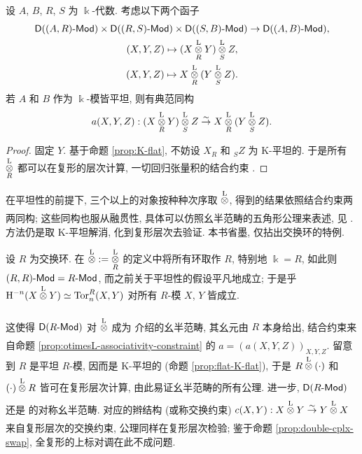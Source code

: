 \begin{proposition}[结合约束]\label{prop:otimesL-associativity-constraint}
	设 $A$, $B$, $R$, $S$ 为 $\Bbbk$-代数. 考虑以下两个函子
	\begin{gather*}
		\cate{D}((A,R)\dcate{Mod}) \times \cate{D}((R,S)\dcate{Mod}) \times \cate{D}((S,B)\dcate{Mod}) \to \cate{D}((A,B)\dcate{Mod}), \\
		(X, Y, Z) \mapsto (X \otimesL[R] Y) \otimesL[S] Z, \\
		(X, Y, Z) \mapsto X \otimesL[R] (Y \otimesL[S] Z).
	\end{gather*}
	若 $A$ 和 $B$ 作为 $\Bbbk$-模皆平坦, 则有典范同构
	\[ a(X,Y,Z): (X \otimesL[R] Y) \otimesL[S] Z \rightiso X \otimesL[R] (Y \otimesL[S] Z). \]
\end{proposition}
\begin{proof}
	固定 $Y$. 基于命题 \ref{prop:K-flat},	不妨设 $X_R$ 和 ${}_S Z$ 为 K-平坦的. 于是所有 $\otimesL[R]$ 都可以在复形的层次计算, 一切回归张量积的结合约束 \cite[命题 6.5.12]{Li1}.
\end{proof}

在平坦性的前提下, 三个以上的对象按种种次序取 $\otimesL$, 得到的结果依照结合约束两两同构; 这些同构也服从融贯性, 具体可以仿照幺半范畴的五角形公理来表述, 见 \cite[定义 3.1.1]{Li1}. 方法仍是取 K-平坦解消, 化到复形层次去验证. 本书省墨, 仅拈出交换环的特例.

\begin{example}\label{eg:commutative-otimesL}
	设 $R$ 为交换环. 在 $\otimesL := \otimesL[R]$ 的定义中将所有环取作 $R$, 特别地 $\Bbbk = R$, 如此则 $(R,R)\dcate{Mod} = R\dcate{Mod}$, 而之前关于平坦性的假设平凡地成立; 于是乎 $\Hm^{-n}(X \otimesL Y) \simeq \Tor^R_n(X,Y)$ 对所有 $R$-模 $X$, $Y$ 皆成立.
	
	这使得 $\cate{D}(R\dcate{Mod})$ 对 $\otimesL$ 成为 \cite[\S 3.1]{Li1} 介绍的幺半范畴, 其幺元由 $R$ 本身给出, 结合约束来自命题 \ref{prop:otimesL-associativity-constraint} 的 $a = (a(X,Y,Z))_{X,Y,Z}$. 留意到 $R$ 是平坦 $R$-模, 因而是 K-平坦的 (命题 \ref{prop:flat-K-flat}), 于是 $R \otimesL (\cdot)$ 和 $(\cdot) \otimesL R$ 皆可在复形层次计算, 由此易证幺半范畴的所有公理. 进一步, $\cate{D}(R\dcate{Mod})$ 还是 \cite[定义 3.3.1]{Li1} 的对称幺半范畴. 对应的辫结构 (或称交换约束) $c(X,Y): X \otimesL Y \rightiso Y \otimesL X$ 来自复形层次的交换约束, 公理同样在复形层次检验; 鉴于命题 \ref{prop:double-cplx-swap}, 全复形的上标对调在此不成问题.
\end{example}

